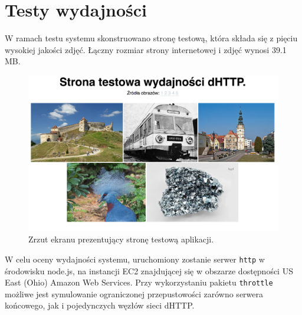 \chapter{Testy wydajności}
\label{cha:testyIOptymalizacje}

W ramach testu systemu skonstruowano stronę testową, która składa się z pięciu wysokiej jakości zdjęć. Łączny rozmiar strony internetowej i zdjęć wynosi 39.1 MB.

\begin{figure}[h]
    \centering
    \includegraphics[scale=0.3]{perf-page.png}

    \caption{Zrzut ekranu prezentujący stronę testową aplikacji.}
    \label{fig:test-page}
\end{figure}

W celu oceny wydajności systemu, uruchomiony zostanie serwer \texttt{http} w środowisku node.js, na instancji EC2 znajdującej się w obszarze dostępności US East (Ohio) Amazon Web Services. Przy wykorzystaniu pakietu \texttt{throttle} \cite{npmThrottle} możliwe jest symulowanie ograniczonej przepustowości zarówno serwera końcowego, jak i pojedynczych węzłów sieci dHTTP.

